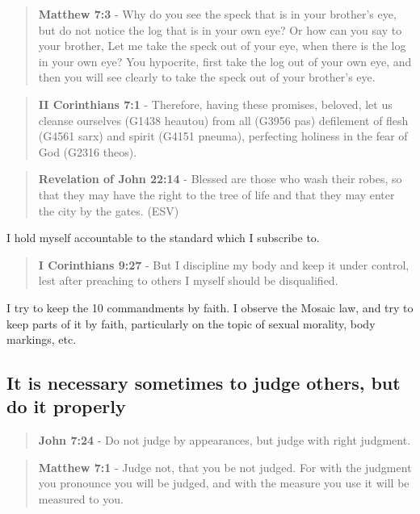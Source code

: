 \documentclass[11pt]{article}
\begin{document}
\begin{quote}
\textbf{Matthew 7:3} - Why do you see the speck that is in your brother's eye, but do not notice the log that is in your own eye?  Or how can you say to your brother, Let me take the speck out of your eye, when there is the log in your own eye?  You hypocrite, first take the log out of your own eye, and then you will see clearly to take the speck out of your brother's eye.
\end{quote}

\begin{quote}
\textbf{II Corinthians 7:1} - Therefore, having these promises, beloved, let us cleanse ourselves (G1438 heautou) from all (G3956 pas) defilement of flesh (G4561 sarx) and spirit (G4151 pneuma), perfecting holiness in the fear of God (G2316 theos).
\end{quote}

\begin{quote}
\textbf{Revelation of John 22:14} - Blessed are those who wash their robes, so that they may have the right to the tree of life and that they may enter the city by the gates. (ESV)
\end{quote}

I hold myself accountable to the standard which I subscribe to.

\begin{quote}
\textbf{I Corinthians 9:27} - But I discipline my body and keep it under control, lest after preaching to others I myself should be disqualified.
\end{quote}

I try to keep the 10 commandments by faith.
I observe the Mosaic law, and try to keep parts of it by faith, particularly
on the topic of sexual morality, body markings, etc.

\subsection{It is necessary sometimes to judge others, but do it properly}
\label{sec:orgd8bfed9}
\begin{quote}
\textbf{John 7:24} - Do not judge by appearances, but judge with right judgment.
\end{quote}

\begin{quote}
\textbf{Matthew 7:1} - Judge not, that you be not judged.  For with the judgment you pronounce you will be judged, and with the measure you use it will be measured to you.
\end{quote}
\end{document}
